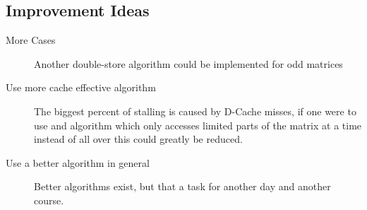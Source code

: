\documentclass{article}
\begin{document}
\subsection{Improvement Ideas}
\begin{description}
    \item[More Cases] Another double-store algorithm could be implemented for odd matrices
    \item[Use more cache effective algorithm] The biggest percent of stalling is caused by D-Cache misses, if one were to use and algorithm which only accesses limited parts of the matrix at a time instead of all over this could greatly be reduced.
    \item[Use a better algorithm in general] Better algorithms exist, but that a task for another day and another course.
\end{description}



\newpage

\end{document}
